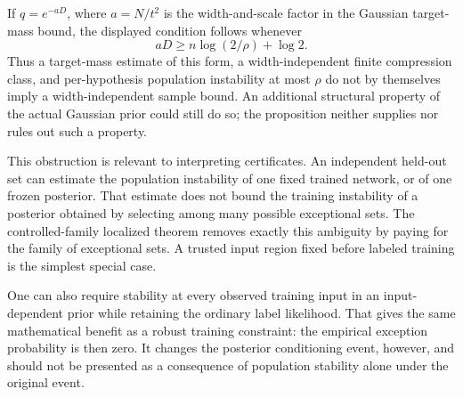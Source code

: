 If $q=e^{-aD}$, where $a=N/t^2$ is the width-and-scale factor in the
Gaussian target-mass bound, the displayed condition follows whenever
\[
 aD\ge n\log(2/\rho)+\log2.
\]
Thus a target-mass estimate of this form, a width-independent finite
compression class, and per-hypothesis population instability at most
$\rho$ do not by themselves imply a width-independent sample bound.
An additional structural property of the actual Gaussian prior could
still do so; the proposition neither supplies nor rules out such a
property.

This obstruction is relevant to interpreting certificates. An independent
held-out set can estimate the population instability of one fixed trained
network, or of one frozen posterior. That estimate does not bound the
training instability of a posterior obtained by selecting among many
possible exceptional sets. The controlled-family localized theorem
removes exactly this ambiguity by paying for the family of exceptional
sets. A trusted input region fixed before labeled training is the
simplest special case.

One can also require stability at every observed training input in an
input-dependent prior while retaining the ordinary label likelihood.
That gives the same mathematical benefit as a robust training constraint:
the empirical exception probability is then zero. It changes the posterior
conditioning event, however, and should not be presented as a consequence
of population stability alone under the original event.

